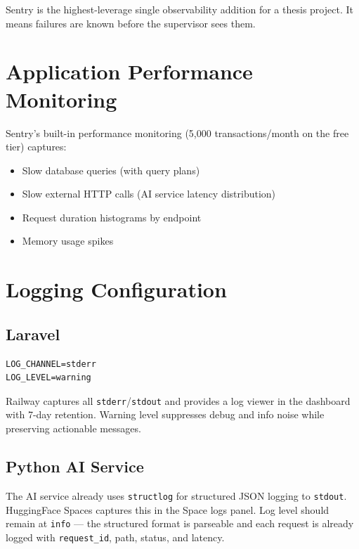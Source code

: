 \documentclass[12pt,a4paper]{report}
\begin{document}
Sentry is the highest-leverage single observability addition for a
thesis project. It means failures are known before the supervisor
sees them.

\section{Application Performance Monitoring}

Sentry's built-in performance monitoring (5,000 transactions/month
on the free tier) captures:

\begin{itemize}[leftmargin=1.5em]
    \item Slow database queries (with query plans)
    \item Slow external HTTP calls (AI service latency distribution)
    \item Request duration histograms by endpoint
    \item Memory usage spikes
\end{itemize}

\section{Logging Configuration}

\subsection{Laravel}

\begin{lstlisting}[caption={Production logging .env}]
LOG_CHANNEL=stderr
LOG_LEVEL=warning
\end{lstlisting}

Railway captures all \texttt{stderr}/\texttt{stdout} and provides a
log viewer in the dashboard with 7-day retention. Warning level
suppresses debug and info noise while preserving actionable messages.

\subsection{Python AI Service}

The AI service already uses \texttt{structlog} for structured JSON
logging to \texttt{stdout}. HuggingFace Spaces captures this in the
Space logs panel. Log level should remain at \texttt{info} — the
structured format is parseable and each request is already logged
with \texttt{request\_id}, path, status, and latency.
\end{document}
